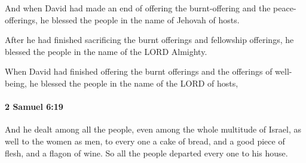 			\begin{versebox}
					\item[BHS] 
					\item[ASV] And when David had made an end of offering the burnt-offering and the peace-offerings, he blessed the people in the name of Jehovah of hosts.
					\item[NIV] After he had finished sacrificing the burnt offerings and fellowship offerings, he blessed the people in the name of the LORD Almighty.
					\item[NRSV] When David had finished offering the burnt offerings and the offerings of well-being, he blessed the people in the name of the LORD of hosts,
			\end{versebox}

		\paragraph{2 Samuel 6:19} %
			\label{2SAMUEL-6-19}

			And he dealt among all the people, even among the whole multitude of Israel, as well to the women as men, to every one a cake of bread, and a good piece of flesh, and a flagon of wine. So all the people departed every one to his house.

